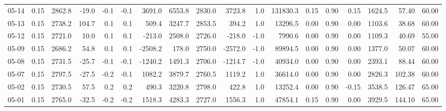 \begin{threeparttable}
{\begin{tabular}{lrrrrrrrrrrrrrrrrr}
  05-14 &     0.15 & 2862.8 &             -19.0 &              -0.1 &               -0.1 &             3691.0 &  6553.8 & 2830.0 &     3723.8 &                      1.0 &            131830.3 &       0.15 &      0.90 &           0.15 &           1624.5 &           57.40 &                  60.00 \\
  05-13 &     0.15 & 2738.2 &             104.7 &               0.1 &                0.1 &              509.4 &  3247.7 & 2853.5 &      394.2 &                      1.0 &             13296.5 &       0.00 &      0.90 &           0.00 &           1103.6 &           38.68 &                  60.00 \\
  05-12 &     0.15 & 2721.0 &              10.0 &               0.1 &                0.1 &             -213.0 &  2508.0 & 2726.0 &     -218.0 &                     -1.0 &              7990.6 &       0.00 &      0.90 &           0.00 &           1109.3 &           40.69 &                  55.00 \\
  05-09 &     0.15 & 2686.2 &              54.8 &               0.1 &                0.1 &            -2508.2 &   178.0 & 2750.0 &    -2572.0 &                     -1.0 &             89894.5 &       0.00 &      0.90 &           0.00 &           1377.0 &           50.07 &                  60.00 \\
  05-08 &     0.15 & 2731.5 &             -25.7 &              -0.1 &               -0.1 &            -1240.2 &  1491.3 & 2706.0 &    -1214.7 &                     -1.0 &             40934.0 &       0.00 &      0.90 &           0.00 &           2393.1 &           88.44 &                  60.00 \\
  05-07 &     0.15 & 2797.5 &             -27.5 &              -0.2 &               -0.1 &             1082.2 &  3879.7 & 2760.5 &     1119.2 &                      1.0 &             36614.0 &       0.00 &      0.90 &           0.00 &           2826.3 &          102.38 &                  60.00 \\
  05-02 &     0.15 & 2730.5 &              57.5 &               0.2 &                0.2 &              490.3 &  3220.8 & 2798.0 &      422.8 &                      1.0 &             13252.4 &       0.00 &      0.90 &          -0.15 &           3538.5 &          126.47 &                  65.00 \\
  05-01 &     0.15 & 2765.0 &             -32.5 &              -0.2 &               -0.2 &             1518.3 &  4283.3 & 2727.0 &     1556.3 &                      1.0 &             47854.1 &       0.15 &      0.90 &           0.00 &           3929.5 &          144.10 &                  65.00 \\

\end{tabular}}
\end{threeparttable}
